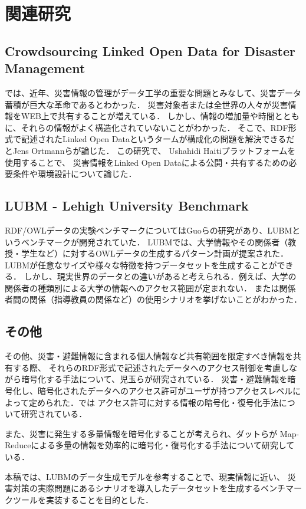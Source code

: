 ﻿%
\chapter{関連研究}

\section{Crowdsourcing Linked Open Data for Disaster Management}

\cite{cite:opendata}では、近年、災害情報の管理がデータ工学の重要な問題とみなして、災害データ蓄積が巨大な革命であるとわかった．
災害対象者または全世界の人々が災害情報をWEB上で共有することが増えている．
しかし、情報の増加量や時間とともに、それらの情報がよく構造化されていないことがわかった．
そこで、RDF形式で記述されたLinked Open Dataというタームが構成化の問題を解決できるだとJens Ortmannらが論じた．
この研究で、 Ushahidi Haitiプラットフォームを使用することで、 災害情報をLinked Open
Dataによる公開・共有するための必要条件や環境設計について論じた．

\section{LUBM - Lehigh University Benchmark}

RDF/OWLデータの実験ベンチマークについてはGuoらの研究があり\cite{cite:lubm}、LUBMというベンチマークが開発されていた．
LUBMでは、大学情報やその関係者（教授・学生など）に対するOWLデータの生成するパターン計画が提案された．
LUBMが任意なサイズや様々な特徴を持つデータセットを生成することができる．
しかし、現実世界のデータとの違いがあると考えられる．例えば、大学の関係者の種類別による大学の情報へのアクセス範囲が定まれない．
または関係者間の関係（指導教員の関係など）の使用シナリオを挙げないことがわかった．

\section{その他}

その他、災害・避難情報に含まれる個人情報など共有範囲を限定すべき情報を共有する際、
それらのRDF形式で記述されたデータへのアクセス制御を考慮しながら暗号化する手法について、児玉らが研究されている\cite{cite:kodama}．
災害・避難情報を暗号化し、暗号化されたデータへのアクセス許可がユーザが持つアクセスレベルによって定められた．\cite{cite:kodama}では
アクセス許可に対する情報の暗号化・復号化手法について研究されている．

また、災害に発生する多量情報を暗号化することが考えられ、ダットら\cite{cite:dat}が
Map-Reduceによる多量の情報を効率的に暗号化・復号化する手法について研究している．

本稿では、LUBMのデータ生成モデルを参考することで、現実情報に近い、
災害対策の実際問題にあるシナリオを導入したデータセットを生成するベンチマークツールを実装することを目的とした．
